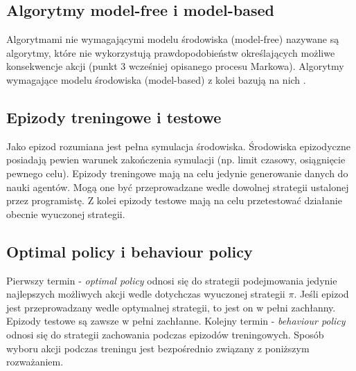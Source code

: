 \documentclass[12pt]{book}
\theoremstyle{plain}
\begin{document}
\subsection*{Algorytmy model-free i model-based}
Algorytmami nie wymagającymi modelu środowiska (model-free) nazywane są algorytmy, które nie wykorzystują prawdopodobieństw określających możliwe konsekwencje akcji (punkt 3 wcześniej opisanego procesu Markowa). Algorytmy wymagające modelu środowiska (model-based) z kolei bazują na nich \cite{reinforcementBook}.
\subsection*{Epizody treningowe i testowe}
Jako epizod rozumiana jest pełna symulacja środowiska. Środowiska epizodyczne posiadają pewien warunek zakończenia symulacji (np. limit czasowy, osiągnięcie pewnego celu). Epizody treningowe mają na celu jedynie generowanie danych do nauki agentów. Mogą one być przeprowadzane wedle dowolnej strategii ustalonej przez programistę. Z kolei epizody testowe mają na celu przetestować działanie obecnie wyuczonej strategii.
\subsection*{Optimal policy i behaviour policy}
Pierwszy termin - \emph{optimal policy} odnosi się do strategii podejmowania jedynie najlepszych możliwych akcji wedle dotychczas wyuczonej strategii $\pi$. Jeśli epizod jest przeprowadzany wedle optymalnej strategii, to jest on w pełni zachłanny. Epizody testowe są zawsze w pełni zachłanne. Kolejny termin - \emph{behaviour policy} odnosi się do strategii zachowania podczas epizodów treningowych. Sposób wyboru akcji podczas treningu jest bezpośrednio związany z poniższym rozważaniem.
\end{document}
